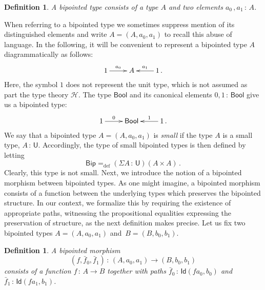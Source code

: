 \documentclass[10pt,a4paper,oneside,reqno]{amsart}
\numberwithin{equation}{section}
\theoremstyle{mythm}
\theoremstyle{mydef}
\newtheorem{definition}[theorem]{Definition}
\theoremstyle{myrmk}
\newcommand{\ie}{\text{i.e.\ }}
\newcommand{\defeq}{=_{\mathrm{def}}}
\newcommand{\co}{\,{:}\,}
\newcommand{\Hint}{\mathcal{H}}
\newcommand{\Bool}{\mathsf{Bool}}
\newcommand{\Id}{\mathsf{Id}}
\newcommand{\U}{\mathsf{U}}
\newcommand{\Bip}{\mathsf{Bip}}
\begin{document}
\begin{definition} \label{thm:bipointedtype}
A \emph{bipointed type} consists of a type $A$ 
and two elements  $a_0 \, , a_1 \co A$. 
\end{definition}



When referring to a bipointed type we sometimes suppress mention of its distinguished elements and write $A = (A, a_0, a_1)$ to recall this abuse of language.  In the following, it will be convenient to represent a bipointed type $A$  
diagrammatically as follows:
\[
\xymatrix{
1 \ar[r]^-{a_0}&  A & 1 \ar[l]_-{a_1} \, .}
 \]
Here, the symbol $1$ does not represent the unit type, which is not assumed as part the type theory $\Hint$.
The type $\Bool$ and its canonical elements $0, 1 \co \Bool$ give us a bipointed type:
\[
\xymatrix{
 1 \ar[r]^-{0}&  \Bool  & 1 \ar[l]_-{1} \, . }
 \]
We say that a bipointed type $A = (A, a_0, a_1)$ is \emph{small} if the type $A$ is a small type, \ie $A \co \U$. 
Accordingly, the type of small bipointed types is then defined by letting 
\[
\Bip \defeq (\Sigma A \co \U)( A \times A ) \, .
\]
Clearly,  this type is not small.  Next, we introduce the notion of a bipointed morphism between bipointed types. 
As one might imagine, a bipointed morphism consists of a function between the underlying types which preserves
the bipointed structure. In our context, we formalize this by requiring the existence of appropriate paths, witnessing the propositional equalities expressing the preservation of structure, as the next definition makes precise. Let us fix two bipointed types $A = (A, a_0, a_1)$ and~$B = (B, b_0, b_1)$. 


\begin{definition} A \emph{bipointed morphism} 
\[
(f, \bar{f}_0, \bar{f}_1)  \co (A, a_0, a_1)  \to (B, b_0, b_1)
\] 
consists of a function $f \co A \to B$ together with paths $\bar{f}_0 \co  \Id(f a_0, b_0)$ 
and~$\bar{f}_1 \co \Id(f a_1, b_1)$.  
\end{definition}
\end{document}
